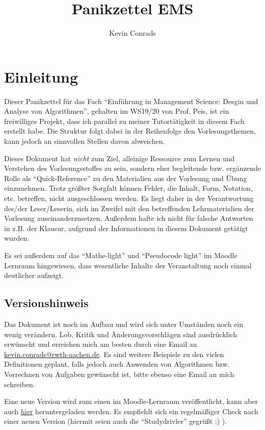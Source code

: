 \documentclass{panikzettel}
\title{Panikzettel EMS}
\author{Kevin Conrads}
\begin{document}
\maketitle

\tableofcontents

\newpage
\section{Einleitung}
Dieser Panikzettel für das Fach ``Einführung in Management Science: Desgin und Analyse von Algorithmen'', gehalten im WS19/20 von Prof. Peis, ist ein freiwilliges Projekt, dass ich parallel zu meiner Tutortätigkeit in diesem Fach erstellt habe. Die Struktur folgt dabei in der Reihenfolge den Vorlesungsthemen, kann jedoch an sinnvollen Stellen davon abweichen.

Dieses Dokument hat \emph{nicht} zum Ziel, alleinige Ressource zum Lernen und Verstehen des Vorlesungsstoffes zu sein, sondern eher  begleitende bzw. ergänzende Rolle als ``Quick-Reference'' zu den Materialien aus der Vorlesung und Übung einzunehmen. Trotz größter Sorgfalt können Fehler, die Inhalt, Form, Notation, etc. betreffen, nicht ausgeschlossen werden. Es liegt daher in der Verantwortung des/der Leser/Leserin, sich im Zweifel mit den betreffenden Lehrmaterialien der Vorlesung auseinanderzusetzen. Außerdem hafte ich nicht für falsche Antworten in z.B. der Klausur, aufgrund der Informationen in diesem Dokument getätigt wurden.

Es sei außerdem auf das ``Mathe-light'' und ``Pseudocode light'' im Moodle Lernraum hingewiesen, dass wesentliche Inhalte der Veranstaltung noch einmal deutlicher aufzeigt.

\subsection{Versionshinweis}
Das Dokument ist noch im Aufbau und wird sich unter Umständen noch ein wenig verändern. Lob, Kritik und Änderungsvorschlägen sind ausdrücklich erwünscht und erreichen mich am besten durch eine Email an \href{mailto:kevin.conrads@rwth-aachen.de}{kevin.conrads@rwth-aachen.de}. Es sind weitere Beispiele zu den vielen Definitionen geplant, falls jedoch auch Anwenden von Algorithmen bzw. Vorrechnen von Aufgaben gewünscht ist, bitte ebenso eine Email an mich schreiben.

Eine neue Version wird zum einen im Moodle-Lernraum veröffentlicht, kann aber auch \href{https://git.rwth-aachen.de/kevin.conrads/ems-script/raw/master/ems.pdf?inline=false}{hier} heruntergeladen werden. Es empfiehlt sich ein regelmäßiger Check nach einer neuen Version (hiermit seien auch die ``Studydrivler'' gegrüßt ;) ).
\end{document}
